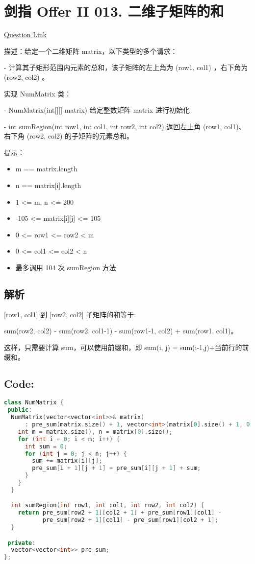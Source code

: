 ﻿\section{剑指 Offer II 013. 二维子矩阵的和}

\href{https://leetcode.cn/problems/O4NDxx/?envType=study-plan&id=lcof-ii&plan=lcof&plan_progress=yc5zsnt}{Question Link}

描述：给定一个二维矩阵 matrix，以下类型的多个请求：

- 计算其子矩形范围内元素的总和，该子矩阵的左上角为 (row1, col1) ，右下角为 (row2,  col2) 。

实现 NumMatrix 类：

- NumMatrix(int[][] matrix) 给定整数矩阵 matrix 进行初始化

- int sumRegion(int row1, int col1, int row2, int col2) 返回左上角 (row1, col1)、右下角 (row2, col2) 的子矩阵的元素总和。

提示：

\begin{itemize}
  \item m == matrix.length
  \item n == matrix[i].length
  \item 1 <= m, n <= 200
  \item -105 <= matrix[i][j] <= 105
  \item 0 <= row1 <= row2 < m
  \item 0 <= col1 <= col2 < n
  \item 最多调用 104 次 sumRegion 方法
\end{itemize}


\subsection{解析}

[row1, col1] 到 [row2, col2] 子矩阵的和等于:

sum(row2, col2) - sum(row2, col1-1) - sum(row1-1, col2) + sum(row1, col1)。

这样，只需要计算 sum，可以使用前缀和，即 sum(i, j) = sum(i-1,j)+当前行的前缀和。

\subsection*{Code:}

\begin{lstlisting}[language=C++]
class NumMatrix {
 public:
  NumMatrix(vector<vector<int>>& matrix)
      : pre_sum(matrix.size() + 1, vector<int>(matrix[0].size() + 1, 0)) {
    int m = matrix.size(), n = matrix[0].size();
    for (int i = 0; i < m; i++) {
      int sum = 0;
      for (int j = 0; j < n; j++) {
        sum += matrix[i][j];
        pre_sum[i + 1][j + 1] = pre_sum[i][j + 1] + sum;
      }
    }
  }

  int sumRegion(int row1, int col1, int row2, int col2) {
    return pre_sum[row2 + 1][col2 + 1] + pre_sum[row1][col1] -
           pre_sum[row2 + 1][col1] - pre_sum[row1][col2 + 1];
  }

 private:
  vector<vector<int>> pre_sum;
};
\end{lstlisting}
